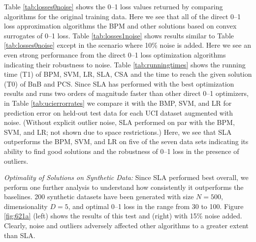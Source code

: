 Table \ref{tab:losses0noise} shows the 0--1 loss values returned by
comparing algorithms for the original training data.  Here we see that all of the
direct 0--1 loss approximation algorithms the BPM and other solutions
based on convex surrogates of 0--1 loss.
Table \ref{tab:losses1noise} shows results similar to
Table \ref{tab:losses0noise} except in the scenario where 
10\% noise is added.  Here we see an even strong performance from the
direct 0--1 loss optimization algorithms indicating their robustness
to noise.
Table \ref{tab:runningtimes} shows the running time (T1) of BPM, SVM,
LR, SLA, CSA and the time to reach the given solution (T0) of BnB and
PCS.
Since SLA has performed with the best optimization results and runs two
orders of magnitude faster than other direct 0--1 optimizers,
in Table \ref{tab:ucierrorrates} we compare it with the BMP, SVM, and
LR for prediction error on held-out test data for each UCI dataset
augmented with noise.  (Without explicit outlier noise, SLA performed
on par with the BPM, SVM, and LR; not shown due to space restrictions.)  
Here, we see that SLA outperforms
the BPM, SVM, and LR on five of the seven data sets indicating its
ability to find good solutions and the robustness of 0--1 loss in the
presence of outliers.

\noindent\emph{Optimality of Solutions on Synthetic Data: } Since SLA
performed best overall, we perform one further analysis to understand
how consistently it outperforms the baselines.  200 synthetic 
datasets have been generated with size $N=500$,
dimensionality $D=5$, and optimal 0--1 loss in the range from 30 to
100. Figure \ref{fig:621a} (left) shows the results of this test and
(right) with 15\% noise added.  Clearly, noise and outliers
adversely affected other algorithms to a greater extent than SLA.

